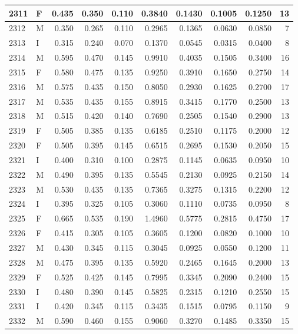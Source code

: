 \documentclass[9pt,twocolumn,twoside,]{pnas-new}
\begin{document}
\begin{tabular}{l|l|r|r|r|r|r|r|r|r}
\hline
2311 & F & 0.435 & 0.350 & 0.110 & 0.3840 & 0.1430 & 0.1005 & 0.1250 & 13\\
\hline
2312 & M & 0.350 & 0.265 & 0.110 & 0.2965 & 0.1365 & 0.0630 & 0.0850 & 7\\
\hline
2313 & I & 0.315 & 0.240 & 0.070 & 0.1370 & 0.0545 & 0.0315 & 0.0400 & 8\\
\hline
2314 & M & 0.595 & 0.470 & 0.145 & 0.9910 & 0.4035 & 0.1505 & 0.3400 & 16\\
\hline
2315 & F & 0.580 & 0.475 & 0.135 & 0.9250 & 0.3910 & 0.1650 & 0.2750 & 14\\
\hline
2316 & M & 0.575 & 0.435 & 0.150 & 0.8050 & 0.2930 & 0.1625 & 0.2700 & 17\\
\hline
2317 & M & 0.535 & 0.435 & 0.155 & 0.8915 & 0.3415 & 0.1770 & 0.2500 & 13\\
\hline
2318 & M & 0.515 & 0.420 & 0.140 & 0.7690 & 0.2505 & 0.1540 & 0.2900 & 13\\
\hline
2319 & F & 0.505 & 0.385 & 0.135 & 0.6185 & 0.2510 & 0.1175 & 0.2000 & 12\\
\hline
2320 & F & 0.505 & 0.395 & 0.145 & 0.6515 & 0.2695 & 0.1530 & 0.2050 & 15\\
\hline
2321 & I & 0.400 & 0.310 & 0.100 & 0.2875 & 0.1145 & 0.0635 & 0.0950 & 10\\
\hline
2322 & M & 0.490 & 0.395 & 0.135 & 0.5545 & 0.2130 & 0.0925 & 0.2150 & 14\\
\hline
2323 & M & 0.530 & 0.435 & 0.135 & 0.7365 & 0.3275 & 0.1315 & 0.2200 & 12\\
\hline
2324 & I & 0.395 & 0.325 & 0.105 & 0.3060 & 0.1110 & 0.0735 & 0.0950 & 8\\
\hline
2325 & F & 0.665 & 0.535 & 0.190 & 1.4960 & 0.5775 & 0.2815 & 0.4750 & 17\\
\hline
2326 & F & 0.415 & 0.305 & 0.105 & 0.3605 & 0.1200 & 0.0820 & 0.1000 & 10\\
\hline
2327 & M & 0.430 & 0.345 & 0.115 & 0.3045 & 0.0925 & 0.0550 & 0.1200 & 11\\
\hline
2328 & M & 0.475 & 0.395 & 0.135 & 0.5920 & 0.2465 & 0.1645 & 0.2000 & 13\\
\hline
2329 & F & 0.525 & 0.425 & 0.145 & 0.7995 & 0.3345 & 0.2090 & 0.2400 & 15\\
\hline
2330 & I & 0.480 & 0.390 & 0.145 & 0.5825 & 0.2315 & 0.1210 & 0.2550 & 15\\
\hline
2331 & I & 0.420 & 0.345 & 0.115 & 0.3435 & 0.1515 & 0.0795 & 0.1150 & 9\\
\hline
2332 & M & 0.590 & 0.460 & 0.155 & 0.9060 & 0.3270 & 0.1485 & 0.3350 & 15\\

\end{tabular}
\end{document}
